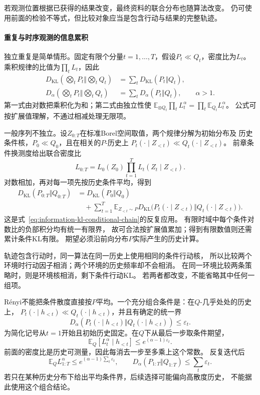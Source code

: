 若观测位置根据已获得的结果改变，最终资料的联合分布也随算法改变。
仍可使用前面的检验不等式，但比较对象应当是包含行动与结果的完整轨迹。

\paragraph{重复与时序观测的信息累积}
\label{sec:information-sequential-accumulation}

独立重复是简单情形。固定有限个分量\(t=1,\ldots,T\)，假设\(P_t\ll Q_t\)，密度比为\(L_t\)。
乘积规律的比值为\(\prod_tL_t\)，因此
\[
\begin{aligned}
  D_{\mathrm{KL}}\left(\bigotimes_tP_t\Big\Vert\bigotimes_tQ_t\right)
     &=\sum_tD_{\mathrm{KL}}(P_t\Vert Q_t),\\
  D_\alpha\left(\bigotimes_tP_t\Big\Vert\bigotimes_tQ_t\right)
     &=\sum_tD_\alpha(P_t\Vert Q_t),\qquad\alpha>1.
\end{aligned}
\]
第一式由对数把乘积化为和；第二式由独立性使
\(\mathbb E_{\otimes Q_t}\prod_tL_t^\alpha=\prod_t\mathbb E_{Q_t}L_t^\alpha\)。
公式可按扩展值理解，不通过相减处理无限项。

一般序列不独立。设\(Z_{0:T}\)在标准Borel空间取值，两个规律分解为初始分布及
历史条件核，\(P_0\ll Q_0\)，且在相关的\(P\)-历史上
\(P_t(\cdot\mid Z_{<t})\ll Q_t(\cdot\mid Z_{<t})\)。
前章条件换测度给出联合密度比
\[
  L_{0:T}=L_0(Z_0)\prod_{t=1}^T L_t(Z_t\mid Z_{<t}).
\]
对数相加，再对每一项先按历史条件平均，得到
\begin{equation}
\begin{aligned}
 D_{\mathrm{KL}}(P_{0:T}\Vert Q_{0:T})
 &=D_{\mathrm{KL}}(P_0\Vert Q_0)\\
 &\quad+\sum_{t=1}^T\mathbb E_{Z_{<t}\sim P}
 D_{\mathrm{KL}}\bigl(P_t(\cdot\mid Z_{<t})
                     \Vert Q_t(\cdot\mid Z_{<t})\bigr).
\end{aligned}
\label{eq:information-trajectory-kl-chain}
\end{equation}
这是式~\eqref{eq:information-kl-conditional-chain}的反复应用。
有限时域中每个条件对数比的负部积分均有统一有限界，
故可合法按扩展值累加；得到有限数值则还需累计条件KL有限。
期望必须沿前向分布\(P\)实际产生的历史计算。

轨迹包含行动时，同一算法在同一历史上使用相同的条件行动核，
所以比较两个环境时行动因子相消；两个环境的历史频率却不会相消。
在同一环境比较两条策略时，则是环境核相消，剩下条件行动KL。
若两者都改变，不能省略其中任何一组项。

Rényi不能把条件散度直接按\(P\)平均。一个充分组合条件是：在\(Q\)-几乎处处的历史上，
\(P_t(\cdot\mid h_{<t})\ll Q_t(\cdot\mid h_{<t})\)，并且有确定的统一界
\[
  D_\alpha(P_t(\cdot\mid h_{<t})\Vert Q_t(\cdot\mid h_{<t}))
  \leq\varepsilon_t.
\]
为简化记号从\(t=1\)开始且初始历史固定。在\(Q\)下从最后一步取条件期望，
\[
  \mathbb E_Q[L_t^\alpha\mid h_{<t}]
       \leq e^{(\alpha-1)\varepsilon_t}.
\]
前面的密度比是历史可测量，因此每消去一步至多乘上这个常数。
反复迭代后
\[
  \mathbb E_Q L_{1:T}^{\alpha}
  \leq e^{(\alpha-1)\sum_t\varepsilon_t},\qquad
  D_\alpha(P_{1:T}\Vert Q_{1:T})\leq\sum_t\varepsilon_t.
\]
若只在某种历史分布下给出平均条件界，后续选择可能偏向高散度历史，
不能据此使用这个组合结论。

